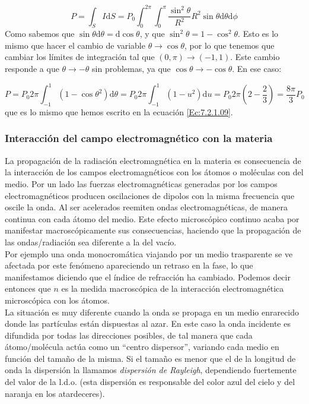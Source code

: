 \documentclass[12pt,a4paper]{article}
\newcommand{\D}{\mathrm{d}}
\numberwithin{equation}{section}
\numberwithin{figure}{section}
\begin{document}
$$ P = \int_S I \D S = P_0 \int_0^{2 \pi} \int_{0}^\pi \dfrac{\sin^2 \theta}{R^2} R^2 \sin \theta \D \theta \D \phi $$
Como sabemos que $\sin \theta \D \theta = \D \cos \theta$, y que $\sin^2 \theta = 1 - \cos^2 \theta$. Esto es lo mismo que hacer el cambio de variable $\theta \rightarrow \cos \theta $, por lo que tenemos que cambiar los límites de integración tal que $(0,\pi) \rightarrow (-1,1)$. Este cambio responde a que $\theta \rightarrow - \theta$ sin problemas, ya que $\cos \theta \rightarrow - \cos \theta$. En ese caso:

$$ P = P_0 2 \pi \int_{-1}^{1} (1-\cos \theta^2) \D \theta = P_0 2 \pi \int_{-1}^{1} (1-u^2) \D u  = P_0 2 \pi (2-\dfrac{2}{3}) = \dfrac{8 \pi}{3} P_0$$ 
que es lo mismo que hemos escrito en la ecuación \ref{Ec:7.2.1.09}.

\hrulefill

\subsubsection{Interacción del campo electromagnético con la materia}

La propagación de la radiación electromagnética en la materia es consecuencia de la interacción de los campos electromagnéticos con los átomos o moléculas con del medio. Por un lado las fuerzas electromagnéticas generadas por los campos electromagnéticos producen oscilaciones de dipolos con la misma frecuencia que oscile la onda. Al ser acelerados reemiten ondas electromagnéticas, de manera continua con cada átomo del medio. Este efecto microscópico continuo acaba por manifestar macroscópicamente sus consecuencias, haciendo que la propagación de las ondas/radiación sea  diferente a la del vacío. \\

Por ejemplo una onda monocromática viajando por un medio trasparente se ve afectada por este fenómeno apareciendo un retraso en la fase, lo que manifestamos diciendo que el índice de refracción ha cambiado. Podemos decir entonces que $n$ es la medida macroscópica de la interacción electromagnética microscópica con los átomos. \\

La situación es muy diferente cuando la onda se propaga en un medio enrarecido donde las partículas están dispuestas al azar. En este caso la onda incidente es difundida por todas las direcciones posibles, de tal manera que cada átomo/molécula actúa como un ``centro dispersor'', variando cada medio en función del tamaño de la misma. Si el tamaño es menor que el de la longitud de onda la dispersión la llamamos \textit{dispersión de Rayleigh}, dependiendo fuertemente del valor de la l.d.o. (esta dispersión es responsable del color azul del cielo y del naranja en los atardeceres). \\
\end{document}
